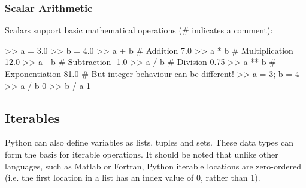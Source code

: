\subsubsection{Scalar Arithmetic}

Scalars support basic mathematical operations (\# indicates a comment):

\begin{python}[frame=single]
>> a = 3.0
>> b = 4.0
>> a + b # Addition
7.0
>> a * b # Multiplication
12.0
>> a - b # Subtraction
-1.0
>> a / b # Division
0.75
>> a ** b  # Exponentiation
81.0
# But integer behaviour can be different!
>> a = 3; b = 4
>> a / b
0
>> b / a
1
\end{python}

\subsection{Iterables}

Python can also define variables as lists, tuples and sets. These data types can form the basis for iterable operations. It should be noted that unlike other languages, such as Matlab or Fortran, Python iterable locations are zero-ordered (i.e. the first location in a list has an index value of 0, rather than 1). 


